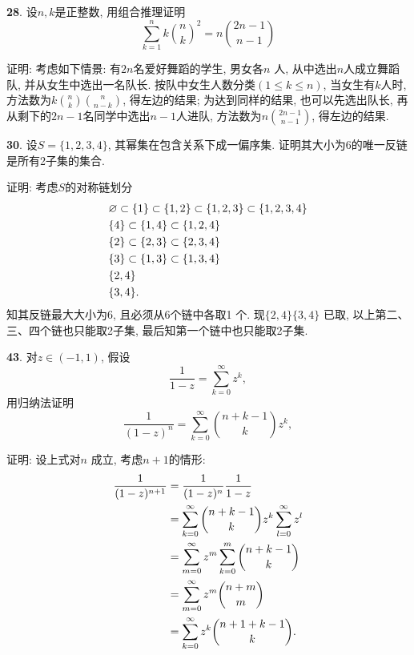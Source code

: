 \documentclass[12pt,a4paper]{article}
\begin{document}
\begin{CJK*}{GBK}{song}
\par \textbf{28}. 设$n,k$是正整数, 用组合推理证明
\begin{displaymath}
\sum_{k=1}^{n} k\binom{n}{k}^2=n\binom{2n-1}{n-1}
\end{displaymath}
\par 证明: 考虑如下情景: 有$2n$名爱好舞蹈的学生, 男女各$n$ 人, 从中选出$n$人成立舞蹈队, 并从女生中选出一名队长. 按队中女生人数分类$(1\le k\le n)$, 当女生有$k$人时, 方法数为$k\binom{n}{k}\binom{n}{n-k}$, 得左边的结果; 为达到同样的结果, 也可以先选出队长, 再从剩下的$2n-1$名同学中选出$n-1$人进队, 方法数为$n\binom{2n-1}{n-1}$, 得左边的结果.

\par \textbf{30}. 设$S=\{1,2,3,4\}$, 其幂集在包含关系下成一偏序集. 证明其大小为6的唯一反链是所有2子集的集合.
\par 证明: 考虑$S$的对称链划分
\begin{align*}
&\varnothing\subset\{1\}\subset\{1,2\}\subset\{1,2,3\}\subset\{1,2,3,4\}\notag\\
&\{4\}\subset\{1,4\}\subset\{1,2,4\}\notag\\
&\{2\}\subset\{2,3\}\subset\{2,3,4\}\notag\\
&\{3\}\subset\{1,3\}\subset\{1,3,4\}\notag\\
&\{2,4\}\notag\\
&\{3,4\}.\notag
\end{align*}
知其反链最大大小为6, 且必须从6个链中各取1 个. 现$\{2,4\}\{3,4\}$ 已取, 以上第二、三、四个链也只能取2子集,
最后知第一个链中也只能取2子集.

\par \textbf{43}. 对$z\in (-1,1)$, 假设
\begin{displaymath}
\frac{1}{1-z}=\sum_{k=0}^\infty z^k,
\end{displaymath}
用归纳法证明
\begin{displaymath}
\frac{1}{(1-z)^n}=\sum_{k=0}^\infty \binom{n+k-1}{k}z^k,
\end{displaymath}
\par 证明: 设上式对$n$ 成立, 考虑$n+1$的情形:
\begin{align*}
\frac{1}{(1-z)^{n+1}}
&=\frac{1}{(1-z)^n}\frac{1}{1-z}\notag\\
&=\sum_{k=0}^\infty \binom{n+k-1}{k}z^k \sum_{l=0}^\infty z^l\notag\\
&=\sum_{m=0}^\infty z^m \sum_{k=0}^m \binom{n+k-1}{k}\notag\\
&=\sum_{m=0}^\infty z^m \binom{n+m}{m}\notag\\
&=\sum_{k=0}^\infty z^k \binom{n+1+k-1}{k}. \notag
\end{align*}


\end{CJK*}
\end{document}
